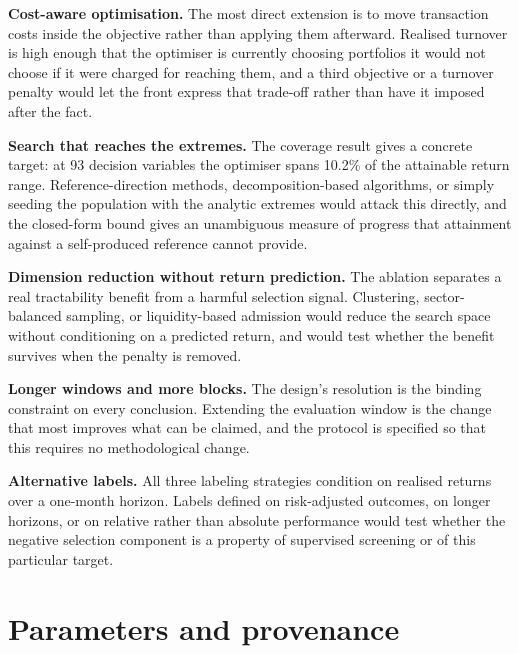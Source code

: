 \documentclass[preprint,11pt,authoryear]{elsarticle}
\begin{document}
\textbf{Cost-aware optimisation.} The most direct extension is to move transaction costs inside the objective rather than applying them afterward. Realised turnover is high enough that the optimiser is currently choosing portfolios it would not choose if it were charged for reaching them, and a third objective or a turnover penalty would let the front express that trade-off rather than have it imposed after the fact.

\textbf{Search that reaches the extremes.} The coverage result gives a concrete target: at 93 decision variables the optimiser spans 10.2\% of the attainable return range. Reference-direction methods, decomposition-based algorithms, or simply seeding the population with the analytic extremes would attack this directly, and the closed-form bound gives an unambiguous measure of progress that attainment against a self-produced reference cannot provide.

\textbf{Dimension reduction without return prediction.} The ablation separates a real tractability benefit from a harmful selection signal. Clustering, sector-balanced sampling, or liquidity-based admission would reduce the search space without conditioning on a predicted return, and would test whether the benefit survives when the penalty is removed.

\textbf{Longer windows and more blocks.} The design's resolution is the binding constraint on every conclusion. Extending the evaluation window is the change that most improves what can be claimed, and the protocol is specified so that this requires no methodological change.

\textbf{Alternative labels.} All three labeling strategies condition on realised returns over a one-month horizon. Labels defined on risk-adjusted outcomes, on longer horizons, or on relative rather than absolute performance would test whether the negative selection component is a property of supervised screening or of this particular target.


\section{Parameters and provenance}\label{sec:parameters}





\end{document}
